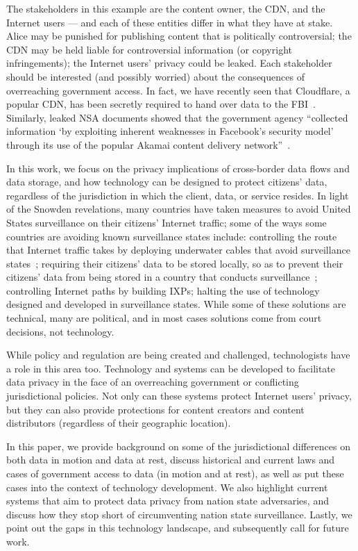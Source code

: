 The stakeholders in this 
example are the content owner, the CDN, and the Internet users --- and each of these entities differ in what 
they have at stake.  Alice may be punished for publishing content that is politically controversial; the CDN 
may be held liable for controversial information (or copyright infringements); the Internet users' 
privacy could be leaked.  Each stakeholder should be interested (and possibly worried) about the 
consequences of overreaching government access.  In fact, we have recently seen that Cloudflare, a popular 
CDN, has been secretly required to hand over data to the FBI~\cite{cloudflare_gag}.  Similarly, leaked 
NSA documents showed that the government agency ``collected information `by exploiting inherent weaknesses 
in Facebook's security model' through its use of the popular Akamai content delivery network''~\cite{}.

In this work, we focus on the privacy implications of cross-border data flows and data 
storage, and how technology can be designed to protect citizens' data, regardless of the 
jurisdiction in which the client, data, or service resides.  In light of 
the Snowden revelations, many countries have taken 
measures to avoid United States surveillance on their citizens' Internet traffic; some of 
the ways some countries are avoiding known surveillance states include: controlling the route 
that Internet traffic takes by deploying underwater cables that avoid surveillance states~\cite{brazil}; 
requiring their citizens' data to be stored locally, so as to prevent their citizens' data from 
being stored in a country that conducts surveillance~\cite{russia}; controlling Internet paths by building 
IXPs; halting the use of technology designed and developed in surveillance states.  While some of these 
solutions are technical, many are political, and in most cases solutions come from court decisions, not 
technology.

While policy and regulation are being created and challenged, technologists have a role 
in this area too.  Technology and systems can be developed to facilitate data privacy in the 
face of an overreaching government or conflicting jurisdictional policies.  Not only can 
these systems protect Internet users' privacy, but they can also provide protections 
for content creators and content distributors (regardless of their geographic location).  

In this paper, we provide background on some of the jurisdictional differences 
on both data in motion and data at rest, discuss historical and current laws and cases of 
government access to data (in motion and at rest), as well as put these cases into the context 
of technology development. We also highlight current systems that aim to protect data privacy from nation 
state adversaries, and discuss how they stop short of circumventing nation state surveillance.  Lastly, we
 point out the gaps in this technology landscape, and 
subsequently call for future work.

